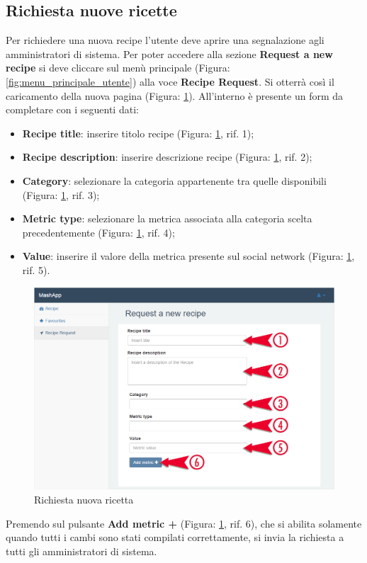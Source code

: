 	\subsection{Richiesta nuove ricette} %
	\label{sec:Richiesta nuove ricette}
		Per richiedere una nuova recipe\gloss{} l'utente deve aprire una segnalazione agli amministratori di sistema.\newline
		Per poter accedere alla sezione \textbf{Request a new recipe} si deve cliccare sul menù principale (Figura: \ref{fig:menu_principale_utente}) alla voce \textbf{Recipe Request}.
		Si otterrà così il caricamento della nuova pagina (Figura: \ref{fig:richiesta_nuova_ricetta}). All'interno è presente un form da completare con i seguenti dati:
		\begin{itemize}
			\item \textbf{Recipe title}: inserire titolo recipe (Figura: \ref{fig:richiesta_nuova_ricetta}, rif. 1);
			\item \textbf{Recipe description}: inserire descrizione recipe (Figura: \ref{fig:richiesta_nuova_ricetta}, rif. 2);
			\item \textbf{Category}: selezionare la categoria appartenente tra quelle disponibili (Figura: \ref{fig:richiesta_nuova_ricetta}, rif. 3);
			\item \textbf{Metric type}: selezionare la metrica associata alla categoria scelta precedentemente (Figura: \ref{fig:richiesta_nuova_ricetta}, rif. 4);
			\item \textbf{Value}: inserire il valore della metrica presente sul social network (Figura: \ref{fig:richiesta_nuova_ricetta}, rif. 5).
		\end{itemize}
		\begin{figure}[H]
			\centering
			\centerline{\includegraphics[width=14cm]{images/richiesta_nuova_ricetta.png}}
			\caption{Richiesta nuova ricetta}
			\label{fig:richiesta_nuova_ricetta}
		\end{figure}
		\noindent
		Premendo sul pulsante \textbf{Add metric +} (Figura: \ref{fig:richiesta_nuova_ricetta}, rif. 6), che si abilita solamente quando tutti i cambi sono stati compilati correttamente, si invia la richiesta a tutti gli amministratori di sistema.


